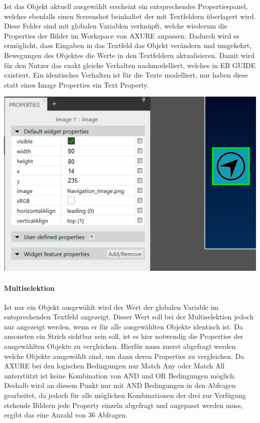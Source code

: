 Ist das Objekt aktuell ausgewählt erscheint ein entsprechendes Propertiespanel, welches ebenfalls einen Screenshot beinhaltet der mit Textfeldern überlagert wird.
Diese Felder sind mit globalen Variablen verknüpft, welche wiederum die Properties der Bilder im Workspace von AXURE anpassen.
Dadurch wird es ermöglicht, dass Eingaben in das Textfeld das Objekt verändern und umgekehrt, Bewegungen des Objektes die Werte in den Textfeldern aktualisieren.
Damit wird für den Nutzer das exakt gleiche Verhalten nachmodelliert, welches in EB GUIDE existiert.
Ein identisches Verhalten ist für die Texte modelliert, nur haben diese statt eines Image Properties ein Text Property.

\begin{center}
  \includegraphics[scale=0.8]{figures/Prototyp_04.PNG}
  \label{fig:Prototyp_04}
\end{center}

\paragraph{Multiselektion}
Ist nur ein Objekt ausgewählt wird der Wert der globalen Variable im entsprechenden Textfeld angezeigt.
Dieser Wert soll bei der Multiselektion jedoch nur angezeigt werden, wenn er für alle ausgewählten Objekte identisch ist.
Da ansonsten ein Strich sichtbar sein soll, ist es hier notwendig die Properties der ausgewählten Objekte zu vergleichen.
Hierfür muss zuerst abgefragt werden welche Objekte ausgewählt sind, um dann deren Properties zu vergleichen.
Da AXURE bei den logischen Bedingungen nur \glqq Match Any\grqq{} oder \glqq Match All\grqq{} unterstützt ist keine Kombination von AND und OR Bedingungen möglich.
Deshalb wird an diesem Punkt nur mit AND Bedingungen in den Abfragen gearbeitet, da jedoch für alle möglichen Kombinationen der drei zur Verfügung stehende Bildern jede Property einzeln abgefragt und angepasst werden muss, ergibt das eine Anzahl von 36 Abfragen.

